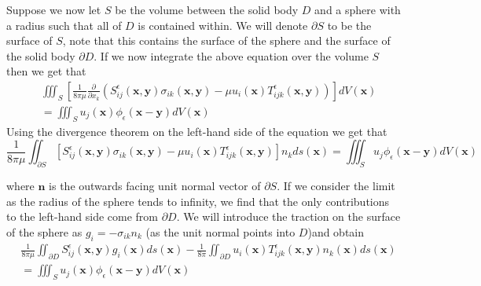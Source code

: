 Suppose we now let $S$ be the volume between the solid body $D$ and a sphere with a radius such that all of $D$ is contained within. We will denote $\partial S$ to be the surface of $S$, note that this contains the surface of the sphere and the surface of the solid body $\partial D$. If we now integrate the above equation over the volume $S$ then we get that
\begin{equation*}
\begin{aligned}
      &\iiint_{S} \left[\frac{1}{8\pi\mu}\frac{\partial}{\partial x_k}(S^\epsilon_{ij}\left(\bm{x}, \bm{y}\right)\sigma_{ik}\left(\bm{x}, \bm{y}\right) - \mu u_i(\bm{x}) T^\epsilon_{ijk}\left(\bm{x}, \bm{y}\right))\right] dV(\bm{x}) \\
      &= \iiint_{S} u_j(\bm{x})\phi_\epsilon(\bm{x}-\bm{y}) dV(\bm{x})  
\end{aligned}
\end{equation*}
Using the divergence theorem on the left-hand side of the equation we get that
\begin{equation*}
  \frac{1}{8\pi\mu}\iint_{\partial S} \left[S^\epsilon_{ij}\left(\bm{x}, \bm{y}\right)\sigma_{ik}\left(\bm{x}, \bm{y}\right) - \mu u_i(\bm{x}) T^\epsilon_{ijk}\left(\bm{x}, \bm{y}\right)\right]n_k ds(\bm{x}) = \iiint_{S} u_j\phi_\epsilon(\bm{x}-\bm{y}) dV(\bm{x})
\end{equation*}

where $\bm{n}$ is the outwards facing unit normal vector of $\partial S$. If we consider the limit as the radius of the sphere tends to infinity, we find that the only contributions to the left-hand side come from $\partial D$. We will introduce the traction on the surface of the sphere as $g_{i} = -\sigma_{ik}n_k$ (as the unit normal points into $D$)and obtain
\begin{equation}
\begin{aligned}
    \label{eq:BIE3}
    &\frac{1}{8\pi\mu}\iint_{\partial D} S^\epsilon_{ij}\left(\bm{x}, \bm{y}\right)g_i(\bm{x}) ds(\bm{x}) - \frac{1}{8\pi}\iint_{\partial D} u_i(\bm{x}) T^\epsilon_{ijk}\left(\bm{x}, \bm{y}\right)n_k(\bm{x}) ds(\bm{x}) \\
    &= \iiint_{S} u_j(\bm{x})\phi_\epsilon(\bm{x}-\bm{y}) dV(\bm{x})
\end{aligned}
\end{equation}

